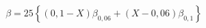 \documentclass[12pt]{article}
\begin{document}
\begin{displaymath}
\beta = 25 \left\{ \left( 0,1 - X \right) \beta_{0,06} + \left( X - 0,06 \right) \beta_{0,1} \right\}
\end{displaymath}
\end{document}
